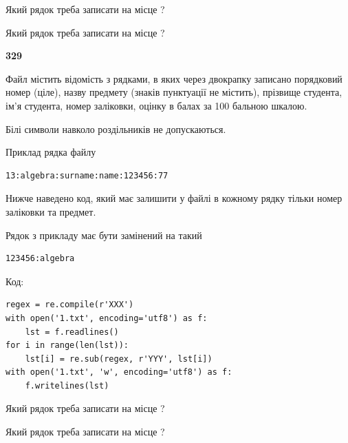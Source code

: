 Який рядок треба записати на місце  ?\par
\vspace{5mm}


Який рядок треба записати на місце  ?\par


\newpage

{\begin {center}\textbf{ 329}\end {center}}\par
Файл  містить відомість з рядками, в яких через двокрапку записано поряд\-ковий номер (ціле), назву предмету (знаків пунктуації не містить), прізвище студента, ім'я студента, номер заліковки, оцінку в балах за 100 бальною шкалою.

Білі символи навколо роздільників не допускаються.

Приклад рядка файлу



\begin{verbatim}
13:algebra:surname:name:123456:77
\end{verbatim}


Нижче наведено код, який має залишити у файлі в кожному рядку тільки номер заліковки та предмет.

Рядок з прикладу має бути замінений на такий



\begin{verbatim}
123456:algebra
\end{verbatim}




Код:



\begin{verbatim}
regex = re.compile(r'XXX')
with open('1.txt', encoding='utf8') as f:
    lst = f.readlines()
for i in range(len(lst)):
    lst[i] = re.sub(regex, r'YYY', lst[i])
with open('1.txt', 'w', encoding='utf8') as f:
    f.writelines(lst)
\end{verbatim}









Який рядок треба записати на місце  ?\par
\vspace{5mm}


Який рядок треба записати на місце  ?\par


